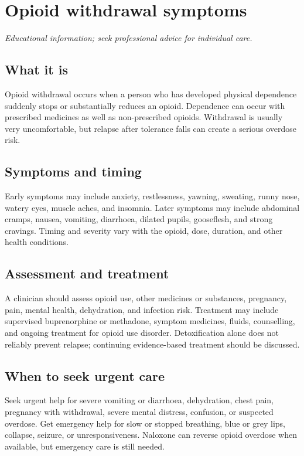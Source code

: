 \chapter{Opioid withdrawal symptoms}

\medskip
\noindent\textit{Educational information; seek professional advice for individual care.}

\section*{What it is}
Opioid withdrawal occurs when a person who has developed physical dependence suddenly stops or substantially reduces an opioid. Dependence can occur with prescribed medicines as well as non-prescribed opioids. Withdrawal is usually very uncomfortable, but relapse after tolerance falls can create a serious overdose risk.

\section*{Symptoms and timing}
Early symptoms may include anxiety, restlessness, yawning, sweating, runny nose, watery eyes, muscle aches, and insomnia. Later symptoms may include abdominal cramps, nausea, vomiting, diarrhoea, dilated pupils, gooseflesh, and strong cravings. Timing and severity vary with the opioid, dose, duration, and other health conditions.

\section*{Assessment and treatment}
A clinician should assess opioid use, other medicines or substances, pregnancy, pain, mental health, dehydration, and infection risk. Treatment may include supervised buprenorphine or methadone, symptom medicines, fluids, counselling, and ongoing treatment for opioid use disorder. Detoxification alone does not reliably prevent relapse; continuing evidence-based treatment should be discussed.

\section*{When to seek urgent care}
Seek urgent help for severe vomiting or diarrhoea, dehydration, chest pain, pregnancy with withdrawal, severe mental distress, confusion, or suspected overdose. Get emergency help for slow or stopped breathing, blue or grey lips, collapse, seizure, or unresponsiveness. Naloxone can reverse opioid overdose when available, but emergency care is still needed.

